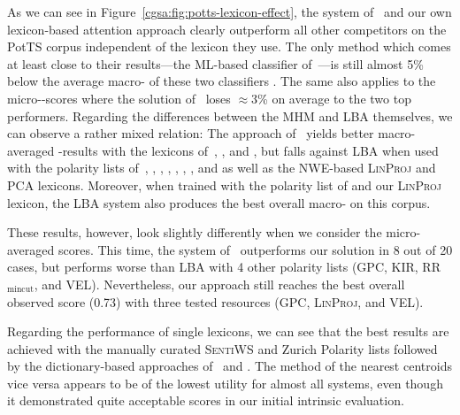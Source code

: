 As we can see in Figure~\ref{cgsa:fig:potts-lexicon-effect}, the
system of~\citet{Mohammad:13} and our own lexicon-based attention
approach clearly outperform all other competitors on the PotTS corpus
independent of the lexicon they use.  The only method which comes at
least close to their results---the ML-based classifier
of~\citet{Guenther:14}---is still almost 5\% below the average
macro-\F{} of these two classifiers .  The same also applies to the
micro-\F-scores where the solution of~\citet{Guenther:14} loses
$\approx$3\% on average to the two top performers.  Regarding the
differences between the MHM and LBA themselves, we can observe a
rather mixed relation: The approach of~\citet{Mohammad:13} yields
better macro-averaged \F{}-results with the lexicons
of~\citet{Esuli:05}, \citet{Vo:16}, and \citet{Clematide:10}, but
falls against LBA when used with the polarity lists
of~\citet{Blair-Goldensohn:08}, \citet{Waltinger:10}, \citet{Hu:04},
\citet{Kiritchenko:14}, \citet{Rao:09}, \citet{Takamura:05},
\citet{Tang:14}, and \citet{Velikovich:10} as well as the NWE-based
\textsc{LinProj} and \textsc{PCA} lexicons.  Moreover, when trained
with the polarity list of \citeauthor{Tang:14} and our
\textsc{LinProj} lexicon, the LBA system also produces the best
overall macro-\F{} on this corpus.

These results, however, look slightly differently when we consider the
micro-averaged scores. This time, the system
of~\citeauthor{Mohammad:13} outperforms our solution in 8 out of 20
cases, but performs worse than LBA with 4 other polarity lists (GPC,
KIR, RR$_{\textrm{mincut}}$, and VEL).  Nevertheless, our approach
still reaches the best overall observed score (0.73) with three tested
resources (GPC, \textsc{LinProj}, and VEL).

Regarding the performance of single lexicons, we can see that the best
results are achieved with the manually curated \textsc{SentiWS} and
Zurich Polarity lists \cite{Remus:10,Clematide:10} followed by the
dictionary-based approaches of~\citet{Blair-Goldensohn:08} and
\citet{Rao:09}.  The method of the nearest centroids vice versa
appears to be of the lowest utility for almost all systems, even
though it demonstrated quite acceptable scores in our initial
intrinsic evaluation.

